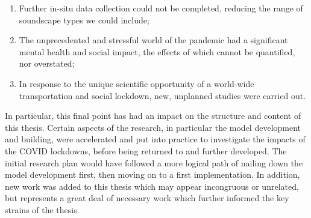 \documentclass[oneside,fontsize=13pt,titlepage]{scrbook}
\begin{document}
\begin{enumerate}
      \item Further in-situ data collection could not be completed, reducing the range of soundscape types we could include;
      \item The unprecedented and stressful world of the pandemic had a significant mental health and social impact, the effects of which cannot be quantified, nor overstated;
      \item In response to the unique scientific opportunity of a world-wide transportation and social lockdown, new, unplanned studies were carried out.
\end{enumerate}

In particular, this final point has had an impact on the structure and content of this thesis. Certain aspects of the research, in particular the model development and building, were accelerated and put into practice to investigate the impacts of the COVID lockdowns, before being returned to and further developed. The initial research plan would have followed a more logical path of nailing down the model development first, then moving on to a first implementation. In addition, new work was added to this thesis which may appear incongruous or unrelated, but represents a great deal of necessary work which further informed the key strains of the thesis.


\tableofcontents

\listoffigures
\listoftables


\mainmatter












\end{document}
